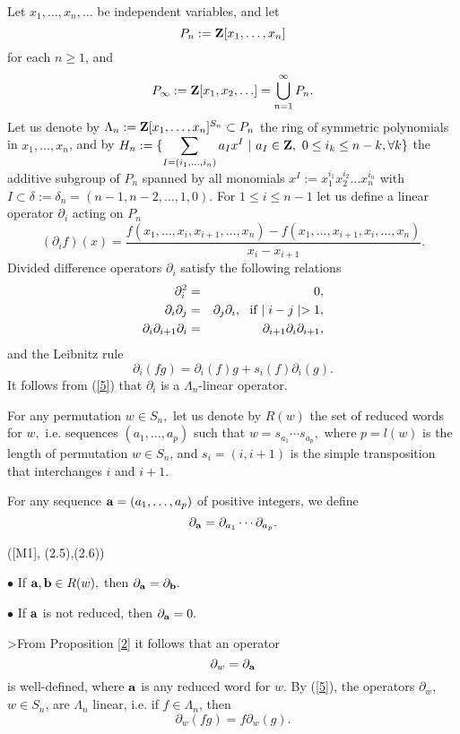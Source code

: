 {Let $x_1,\ldots ,x_n,\ldots$ be independent variables, and let
$$P_n:={\bf Z}[x_1,\ldots ,x_n]
$$
for each $n\ge 1$, and 
\begin{equation}
P_{\infty}:={\bf Z}[x_1,x_2,\ldots ]={\displaystyle\bigcup_{n=1}^{\infty}P_n}.
\end{equation}
Let us denote by $\Lambda_n:={\bf Z}[x_1,\ldots ,x_n]^{S_n}\subset P_n$
the ring of symmetric polynomials in $x_1,\ldots ,x_n$, and by 
$H_n:=\{\displaystyle\sum_{I=(i_1,\ldots ,i_n)}a_Ix^I~|~a_I\in{\bf Z}, \ 0\le 
i_k\le n-k, \forall k\}$ the additive subgroup of $P_n$ spanned by all 
monomials $x^I:=x_1^{i_1}x_2^{i_2}\ldots x_n^{i_n}$ with $I\subset\delta 
:=\delta_n=(n-1,n-2,\ldots ,1,0)$. For 
$1\le i\le n-1$ let us define a linear operator $\partial_i$ acting on 
$P_n$
\begin{equation}
(\partial_i f)(x)= \frac{f(x_1,\ldots,x_i,x_{i+1},\ldots,x_n)
-f(x_1,\ldots,x_{i+1},x_i,\ldots,x_n)}
{x_i-x_{i+1}}.
\end{equation} 
Divided difference operators $\partial_i$ satisfy the following 
relations 
\begin{eqnarray}
\partial_i^2 & = & 0,\nonumber \\ 
\partial_i \partial_j & = & \partial_j \partial_i,
\ \ {\rm if} \mid i-j \mid >1, \\ 
\partial_i \partial_{i+1} \partial_i & = & 
\partial_{i+1} \partial_i \partial_{i+1}, \nonumber
\end{eqnarray}
and the Leibnitz rule 
\begin{equation} 
\partial_i (fg) = \partial_i(f)g+s_i(f) \partial_i(g).\label{5}
\end{equation}
It follows from (\ref{5})  that $\partial_i$ is a $\Lambda_n$-linear operator. 

For any permutation $w\in S_n,$ let us denote by $R(w)$ the set of 
reduced words for $w,$ i.e. sequences $(a_1,\ldots,a_p)$ such that 
$w= s_{a_1}\cdots s_{a_p},$ where $p=l(w)$ is the length of permutation 
$w\in S_n$, and $s_i=(i,i+1)$ is the simple 
transposition that interchanges $i$ and $i+1.$ 

For any sequence ${\bf a}=(a_1,\ldots,a_p)$ of positive integers, 
we define 
\[ \partial_{\bf a}= \partial_{a_1}\cdots\partial_{a_p}. \] 
\begin{pr}\label{2} ([M1], (2.5),(2.6))

$\bullet$ If ${\bf a,b}\in R(w),$ then $\partial_{\bf a}=\partial_{\bf b}.$ 

\vskip 0.1cm
$\bullet$ If ${\bf a}$ is not reduced, then $\partial_{\bf a}=0.$ 
\end{pr}
>From Proposition \ref{2} it follows that an operator \[ \partial_w = \partial_{\bf a} \] 
is well-defined, where ${\bf a}$ is any reduced word for $w.$ By (\ref{5}), the 
operators $\partial_w$, $w\in S_n$, are $\Lambda_n$ linear, i.e. if
$f\in\Lambda_n$, then
$$\partial_w(fg)=f\partial_w(g).
$$                                     

}
